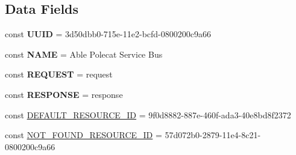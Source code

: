 \subsection*{Data Fields}
\begin{DoxyCompactItemize}
\item 
\hypertarget{class_able_polecat___service___bus_a74b892c8c0b86bf9d04c5819898c51e7}{}const {\bfseries U\+U\+I\+D} = \textquotesingle{}3d50dbb0-\/715e-\/11e2-\/bcfd-\/0800200c9a66\textquotesingle{}\label{class_able_polecat___service___bus_a74b892c8c0b86bf9d04c5819898c51e7}

\item 
\hypertarget{class_able_polecat___service___bus_a244352f035b82b20b0efa506167fd862}{}const {\bfseries N\+A\+M\+E} = \textquotesingle{}Able Polecat Service Bus\textquotesingle{}\label{class_able_polecat___service___bus_a244352f035b82b20b0efa506167fd862}

\item 
\hypertarget{class_able_polecat___service___bus_a57855ef857a96d7875af09252924fa9d}{}const {\bfseries R\+E\+Q\+U\+E\+S\+T} = \textquotesingle{}request\textquotesingle{}\label{class_able_polecat___service___bus_a57855ef857a96d7875af09252924fa9d}

\item 
\hypertarget{class_able_polecat___service___bus_aeceb2443acdcd67275ffd982cb00fa15}{}const {\bfseries R\+E\+S\+P\+O\+N\+S\+E} = \textquotesingle{}response\textquotesingle{}\label{class_able_polecat___service___bus_aeceb2443acdcd67275ffd982cb00fa15}

\item 
const \hyperlink{class_able_polecat___service___bus_a6812e1b07c5d6333a734e863afdd3231}{D\+E\+F\+A\+U\+L\+T\+\_\+\+R\+E\+S\+O\+U\+R\+C\+E\+\_\+\+I\+D} = \textquotesingle{}9f0d8882-\/887e-\/460f-\/ada3-\/40e8bd8f2372\textquotesingle{}
\item 
const \hyperlink{class_able_polecat___service___bus_a9df65a1efe90e8bb8d0e234da978a2db}{N\+O\+T\+\_\+\+F\+O\+U\+N\+D\+\_\+\+R\+E\+S\+O\+U\+R\+C\+E\+\_\+\+I\+D} = \textquotesingle{}57d072b0-\/2879-\/11e4-\/8c21-\/0800200c9a66\textquotesingle{}
\end{DoxyCompactItemize}
